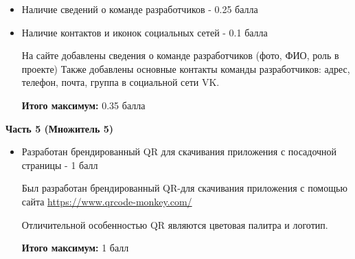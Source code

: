 \begin{itemize}
    \item Наличие сведений о команде разработчиков - 0.25 балла
    \item Наличие контактов и иконок социальных сетей - 0.1 балла
    
    На сайте добавлены сведения о команде разработчиков (фото, ФИО, роль в проекте)
    Также добавлены основные контакты команды разработчиков: адрес, телефон, почта, группа в социальной сети VK.

    \textbf{Итого максимум:} 0.35 балла
\end{itemize}

\textbf{Часть 5 (Множитель 5)}

\begin{itemize}
    \item Разработан брендированный QR для скачивания приложения с посадочной страницы - 1 балл

    Был разработан брендированный QR-для скачивания приложения с помощью сайта \url{https://www.qrcode-monkey.com/}
    
    Отличительной особенностью QR являются цветовая палитра и логотип.
    

    \textbf{Итого максимум:} 1 балл
\end{itemize}